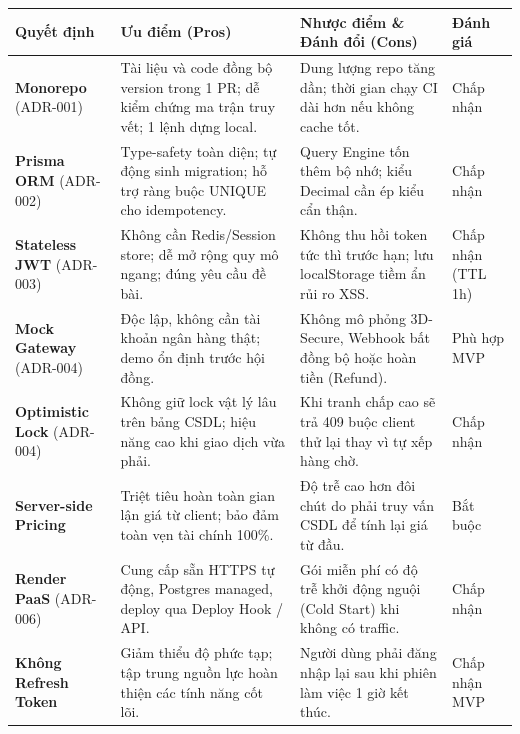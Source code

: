 \documentclass[11pt, a4paper]{article}
\begin{document}
\begin{table}[h!]
	\small
	\centering
	\begin{tabular}{p{2.8cm} p{4.6cm} p{5cm} p{1.6cm}}
		\toprule
		\rowcolor{tableheader}
		\textbf{Quyết định}                & \textbf{Ưu điểm (Pros)}                                                                         & \textbf{Nhược điểm \& Đánh đổi (Cons)}                                      & \textbf{Đánh giá}  \\
		\midrule
		\textbf{Monorepo} (ADR-001)        & Tài liệu và code đồng bộ version trong 1 PR; dễ kiểm chứng ma trận truy vết; 1 lệnh dựng local. & Dung lượng repo tăng dần; thời gian chạy CI dài hơn nếu không cache tốt.    & Chấp nhận          \\
		\textbf{Prisma ORM} (ADR-002)      & Type-safety toàn diện; tự động sinh migration; hỗ trợ ràng buộc UNIQUE cho idempotency.         & Query Engine tốn thêm bộ nhớ; kiểu Decimal cần ép kiểu cẩn thận.            & Chấp nhận          \\
		\textbf{Stateless JWT} (ADR-003)   & Không cần Redis/Session store; dễ mở rộng quy mô ngang; đúng yêu cầu đề bài.                    & Không thu hồi token tức thì trước hạn; lưu localStorage tiềm ẩn rủi ro XSS. & Chấp nhận (TTL 1h) \\
		\textbf{Mock Gateway} (ADR-004)    & Độc lập, không cần tài khoản ngân hàng thật; demo ổn định trước hội đồng.                       & Không mô phỏng 3D-Secure, Webhook bất đồng bộ hoặc hoàn tiền (Refund).      & Phù hợp MVP        \\
		\textbf{Optimistic Lock} (ADR-004) & Không giữ lock vật lý lâu trên bảng CSDL; hiệu năng cao khi giao dịch vừa phải.                 & Khi tranh chấp cao sẽ trả 409 buộc client thử lại thay vì tự xếp hàng chờ.  & Chấp nhận          \\
		\textbf{Server-side Pricing}       & Triệt tiêu hoàn toàn gian lận giá từ client; bảo đảm toàn vẹn tài chính 100\%.                  & Độ trễ cao hơn đôi chút do phải truy vấn CSDL để tính lại giá từ đầu.       & Bắt buộc           \\
		\textbf{Render PaaS} (ADR-006)     & Cung cấp sẵn HTTPS tự động, Postgres managed, deploy qua Deploy Hook / API.                     & Gói miễn phí có độ trễ khởi động nguội (Cold Start) khi không có traffic.   & Chấp nhận          \\
		\textbf{Không Refresh Token}       & Giảm thiểu độ phức tạp; tập trung nguồn lực hoàn thiện các tính năng cốt lõi.                   & Người dùng phải đăng nhập lại sau khi phiên làm việc 1 giờ kết thúc.        & Chấp nhận MVP      \\
		\bottomrule
	\end{tabular}
\end{table}
\end{document}
